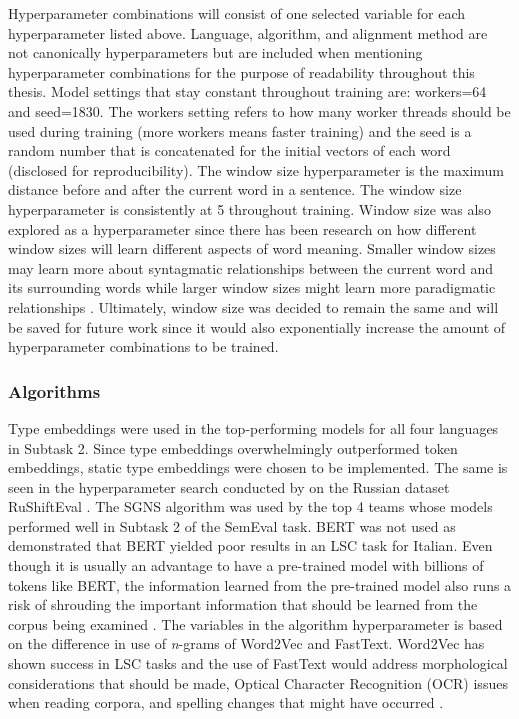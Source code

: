 Hyperparameter combinations will consist of one selected variable for each hyperparameter listed above. Language, algorithm, and alignment method are not canonically hyperparameters but are included when mentioning hyperparameter combinations for the purpose of readability throughout this thesis. 
Model settings that stay constant throughout training are: workers=64 and seed=1830. The workers setting refers to how many worker threads should be used during training (more workers means faster training) and the seed is a random number that is concatenated for the initial vectors of each word (disclosed for reproducibility). The window size hyperparameter is the maximum distance before and after the current word in a sentence. The window size hyperparameter is consistently at 5 throughout training. Window size was also explored as a hyperparameter since there has been research on how different window sizes will learn different aspects of word meaning. Smaller window sizes may learn more about syntagmatic relationships between the current word and its surrounding words while larger window sizes might learn more paradigmatic relationships \citep{dca2019-nulty}. Ultimately, window size was decided to remain the same and will be saved for future work since it would also exponentially increase the amount of hyperparameter combinations to be trained.


\subsubsection{Algorithms}

Type embeddings were used in the top-performing models for all four languages in Subtask 2.  Since type embeddings overwhelmingly outperformed token embeddings, static type embeddings were chosen to be implemented. The same is seen in the hyperparameter search conducted by \citet{hengchen2021SBXrushifteval} on the Russian dataset RuShiftEval \citep{rushifteval2021}. The SGNS algorithm was used by the top 4 teams whose models performed well in Subtask 2 of the SemEval task. BERT was not used as \citet{laicher-2020} demonstrated that BERT yielded poor results in an LSC task for Italian. Even though it is usually an advantage to have a pre-trained model with billions of tokens like BERT, the information learned from the pre-trained model also runs a risk of shrouding the important information that should be learned from the corpus being examined \citep{hengchen2021challenges}. The variables in the algorithm hyperparameter is based on the difference in use of \emph{n}-grams of Word2Vec and FastText. Word2Vec has shown success in LSC tasks and the use of FastText would address morphological considerations that should be made, Optical Character Recognition (OCR) issues when reading corpora, and spelling changes that might have occurred \citep{bojanowski2017enriching}. 


